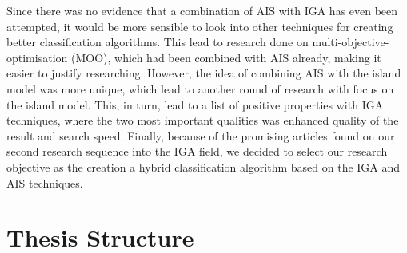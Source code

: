 Since there was no evidence that a combination of AIS with IGA has even been attempted, it would be more sensible to look into other techniques for creating better classification algorithms. This lead to research done on multi-objective-optimisation (MOO), which had been combined with AIS already, making it easier to justify researching. However, the idea of combining AIS with the island model was more unique, which lead to another round of research with focus on the island model. This, in turn, lead to a list of positive properties with IGA techniques, where the two most important qualities was enhanced quality of the result and search speed. Finally, because of the promising articles found on our second research sequence into the IGA field, we decided to select our research objective as the creation a hybrid classification algorithm based on the IGA and AIS techniques. 



\section{Thesis Structure}
\label{sec:thesisStructure}

